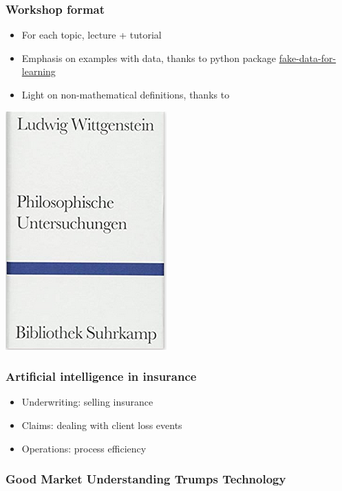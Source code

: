\begin{frame}
\frametitle{Workshop format}

\begin{itemize}
\item For each topic, lecture + tutorial
\item Emphasis on examples with data, thanks to python package \href{https://github.com/munichpavel/fake-data-for-learning}{fake-data-for-learning}
\item Light on non-mathematical definitions, thanks to 
\end{itemize}
\centering
\includegraphics[width=0.3\textheight]{figures/pi_wittgenstein}
\end{frame}

\begin{frame}
  \frametitle{Artificial intelligence in insurance}

  \begin{itemize}
    \item Underwriting: selling insurance
    \item Claims: dealing with client loss events
    \item Operations: process efficiency
  \end{itemize}
\end{frame}

\begin{frame}
\frametitle{Good Market Understanding Trumps Technology}
\centering
{}
\end{frame}

